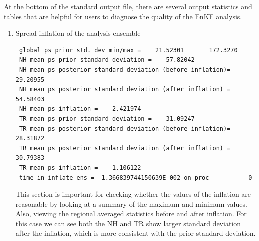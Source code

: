 At the bottom of the standard output file, there are several output statistics and tables that are helpful for users to diagnose the quality of the EnKF analysis.\\
\begin{enumerate}
\item Spread inflation of the analysis ensemble

\begin{footnotesize}
\begin{verbatim}
 global ps prior std. dev min/max =    21.52301       172.3270
 NH mean ps prior standard deviation =    57.82042
 NH mean ps posterior standard deviation (before inflation)=    29.20955
 NH mean ps posterior standard deviation (after inflation) =    54.58403
 NH mean ps inflation =    2.421974
 TR mean ps prior standard deviation =    31.09247
 TR mean ps posterior standard deviation (before inflation)=    28.31872
 TR mean ps posterior standard deviation (after inflation) =    30.79383
 TR mean ps inflation =    1.106122
 time in inflate_ens =  1.366839744150639E-002 on proc           0
\end{verbatim}
\end{footnotesize}

This section is important for checking whether the values of the inflation are reasonable by looking at a summary of the maximum and minimum values. Also, viewing the regional averaged statistics before and after inflation. For this case we can see both the NH and TR show larger standard deviation after the inflation, which is more consistent with the prior standard deviation. \\


\end{enumerate}
